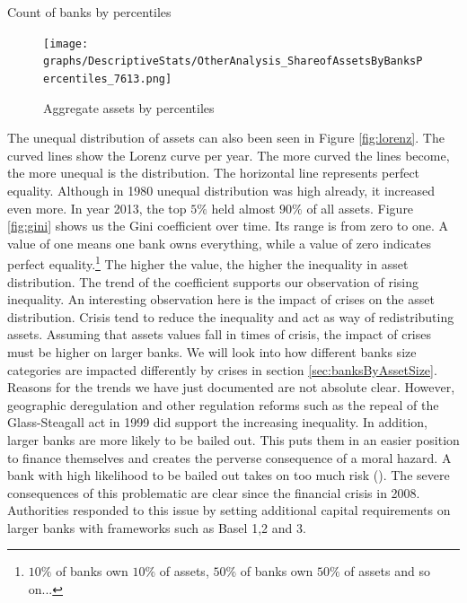 \documentclass[12pt, a4paper]{article} %
\begin{document}
\begin{table}[H]
\begin{minipage}{\textwidth}
\scriptsize

\caption[1]{Count of banks by percentiles}
\label{table:assetsByPercentiles}
\end{minipage}
\end{table}

\begin{figure}[H]
\texttt{[image: graphs/DescriptiveStats/OtherAnalysis\_ShareofAssetsByBanksPercentiles\_7613.png]}
\centering
\caption{Aggregate assets by percentiles}
\label{fig:assetsByPercentiles}
\end{figure}


The unequal distribution of assets can also been seen in Figure \ref{fig:lorenz}. The curved lines show the Lorenz curve per year. The more curved the lines become, the more unequal is the distribution. The horizontal line represents perfect equality. Although in 1980 unequal distribution was high already, it increased even more. In year 2013, the top $5\%$ held almost $90\%$ of all assets. Figure \ref{fig:gini} shows us the Gini coefficient over time. Its range is from zero to one. A value of one means one bank owns everything, while a value of zero indicates perfect equality.\footnote{$10\%$ of banks own $10\%$ of assets, $50\%$ of banks own $50\%$ of assets and so on...} The higher the value, the higher the inequality in asset distribution. The trend of the coefficient supports our observation of rising inequality. An interesting observation here is the impact of crises on the asset distribution. Crisis tend to reduce the inequality and act as way of redistributing assets. Assuming that assets values fall in times of crisis, the impact of crises must be higher on larger banks. We will look into how different banks size categories are impacted differently by crises in section \ref{sec:banksByAssetSize}.
Reasons for the trends we have just documented are not absolute clear. However, geographic deregulation and other regulation reforms such as the repeal of the Glass-Steagall act in 1999 did support the increasing inequality. In addition, larger banks are more likely to be bailed out. This puts them in an easier position to finance themselves and creates the perverse consequence of a moral hazard. A bank with high likelihood to be bailed out takes on too much risk (\citet{FarhiTirole2012}). The severe consequences of this problematic are clear since the financial crisis in 2008. Authorities responded to this issue by setting additional capital requirements on larger banks with frameworks such as Basel 1,2 and 3. 
\end{document}

